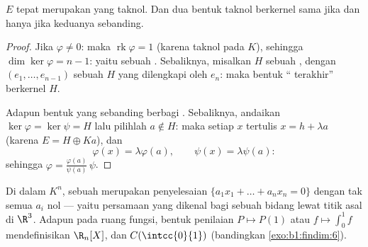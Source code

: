 \begin{theorem}\label{thm:b1:linmaps:hyperplanes}
 $E$ tepat merupakan  
yang taknol. Dan dua bentuk taknol berkernel sama jika dan hanya jika keduanya
sebanding.
\end{theorem}

\begin{proof}
Jika $\varphi \neq 0$: maka $\operatorname{rk}\varphi = 1$ (karena  
taknol pada $K$), sehingga $\dim\ker\varphi = n - 1$: yaitu sebuah .
Sebaliknya, misalkan $H$ sebuah , dengan $(e_1, \dots, e_{n-1})$ sebuah 
$H$ yang dilengkapi oleh $e_n$: maka bentuk `` terakhir'' berkernel
$H$.

Adapun bentuk yang sebanding berbagi . Sebaliknya, andaikan
$\ker\varphi = \ker\psi = H$ lalu pilihlah $a \notin H$: maka setiap $x$ tertulis
$x = h + \lambda a$ (karena $E = H \oplus Ka$), dan
\[
\varphi(x) = \lambda \varphi(a), \qquad \psi(x) = \lambda\psi(a):
\]
sehingga $\varphi = \frac{\varphi(a)}{\psi(a)}\,\psi$.
\end{proof}

\begin{example}\label{ex:b1:linmaps:hyperplane}
Di dalam $K^n$, sebuah  merupakan  penyelesaian $\{a_1 x_1 + \dots + a_n
x_n = 0\}$ dengan tak semua $a_i$ nol --- yaitu persamaan yang dikenal bagi sebuah
bidang lewat titik asal di $\R^3$. Adapun pada ruang fungsi, bentuk
penilaian $P \mapsto P(1)$ atau $f \mapsto \int_0^1 f$ mendefinisikan 
$\R_n[X]$, dan $C(\intcc{0}{1})$ (bandingkan \cref{exo:b1:findim:6}).
\end{example}

